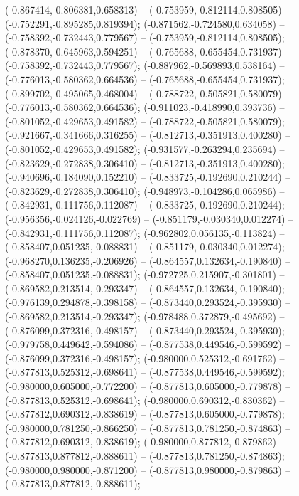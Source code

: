  (-0.867414,-0.806381,0.658313) -- (-0.753959,-0.812114,0.808505) -- (-0.752291,-0.895285,0.819394);
 (-0.871562,-0.724580,0.634058) -- (-0.758392,-0.732443,0.779567) -- (-0.753959,-0.812114,0.808505);
 (-0.878370,-0.645963,0.594251) -- (-0.765688,-0.655454,0.731937) -- (-0.758392,-0.732443,0.779567);
 (-0.887962,-0.569893,0.538164) -- (-0.776013,-0.580362,0.664536) -- (-0.765688,-0.655454,0.731937);
 (-0.899702,-0.495065,0.468004) -- (-0.788722,-0.505821,0.580079) -- (-0.776013,-0.580362,0.664536);
 (-0.911023,-0.418990,0.393736) -- (-0.801052,-0.429653,0.491582) -- (-0.788722,-0.505821,0.580079);
 (-0.921667,-0.341666,0.316255) -- (-0.812713,-0.351913,0.400280) -- (-0.801052,-0.429653,0.491582);
 (-0.931577,-0.263294,0.235694) -- (-0.823629,-0.272838,0.306410) -- (-0.812713,-0.351913,0.400280);
 (-0.940696,-0.184090,0.152210) -- (-0.833725,-0.192690,0.210244) -- (-0.823629,-0.272838,0.306410);
 (-0.948973,-0.104286,0.065986) -- (-0.842931,-0.111756,0.112087) -- (-0.833725,-0.192690,0.210244);
 (-0.956356,-0.024126,-0.022769) -- (-0.851179,-0.030340,0.012274) -- (-0.842931,-0.111756,0.112087);
 (-0.962802,0.056135,-0.113824) -- (-0.858407,0.051235,-0.088831) -- (-0.851179,-0.030340,0.012274);
 (-0.968270,0.136235,-0.206926) -- (-0.864557,0.132634,-0.190840) -- (-0.858407,0.051235,-0.088831);
 (-0.972725,0.215907,-0.301801) -- (-0.869582,0.213514,-0.293347) -- (-0.864557,0.132634,-0.190840);
 (-0.976139,0.294878,-0.398158) -- (-0.873440,0.293524,-0.395930) -- (-0.869582,0.213514,-0.293347);
 (-0.978488,0.372879,-0.495692) -- (-0.876099,0.372316,-0.498157) -- (-0.873440,0.293524,-0.395930);
 (-0.979758,0.449642,-0.594086) -- (-0.877538,0.449546,-0.599592) -- (-0.876099,0.372316,-0.498157);
 (-0.980000,0.525312,-0.691762) -- (-0.877813,0.525312,-0.698641) -- (-0.877538,0.449546,-0.599592);
 (-0.980000,0.605000,-0.772200) -- (-0.877813,0.605000,-0.779878) -- (-0.877813,0.525312,-0.698641);
 (-0.980000,0.690312,-0.830362) -- (-0.877812,0.690312,-0.838619) -- (-0.877813,0.605000,-0.779878);
 (-0.980000,0.781250,-0.866250) -- (-0.877813,0.781250,-0.874863) -- (-0.877812,0.690312,-0.838619);
 (-0.980000,0.877812,-0.879862) -- (-0.877813,0.877812,-0.888611) -- (-0.877813,0.781250,-0.874863);
 (-0.980000,0.980000,-0.871200) -- (-0.877813,0.980000,-0.879863) -- (-0.877813,0.877812,-0.888611);
